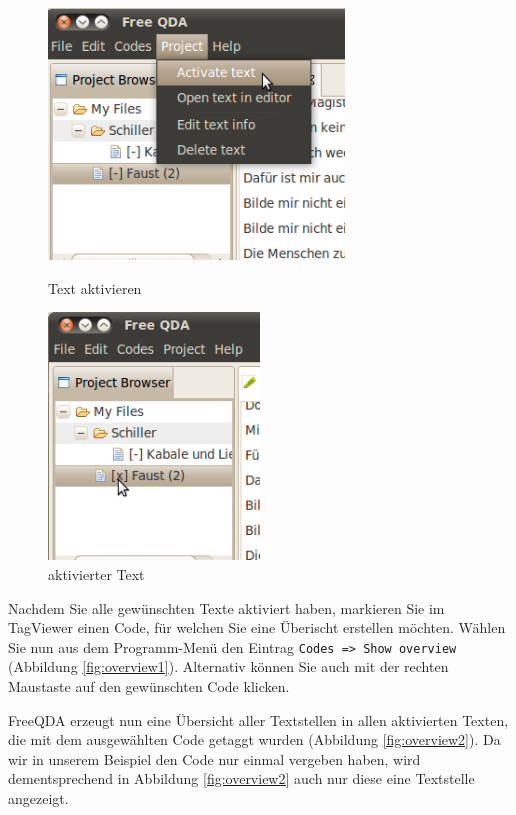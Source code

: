 \begin{figure}[!hbt]
\begin{minipage}[!hb!]{0.5\textwidth}\scriptsize
	\centering
	 \includegraphics[width=0.7\textwidth]{img/activatetext1}
	\caption{Text aktivieren}
	\label{fig:activatetext1}
\end{minipage}
\hfill
\begin{minipage}[!hb!]{0.5\textwidth}
	\centering
	 \includegraphics[width=0.5\textwidth]{img/activatetext2}
	\caption{aktivierter Text}
	\label{fig:activatetext2}
\end{minipage}
\end{figure}

Nachdem Sie alle gewünschten Texte aktiviert haben, markieren Sie im TagViewer einen Code, für welchen Sie eine Überischt erstellen möchten. %
Wählen Sie nun aus dem Programm-Menü den Eintrag \texttt{Codes => Show overview} (Abbildung \ref{fig:overview1}). Alternativ können Sie auch %
mit der rechten Maustaste auf den gewünschten Code klicken.

FreeQDA erzeugt nun eine Übersicht aller Textstellen in allen aktivierten Texten, die mit dem ausgewählten Code getaggt wurden (Abbildung \ref{fig:overview2}).
Da wir in unserem Beispiel den Code nur einmal vergeben haben, wird dementsprechend in Abbildung \ref{fig:overview2} auch nur diese eine %
Textstelle angezeigt.

